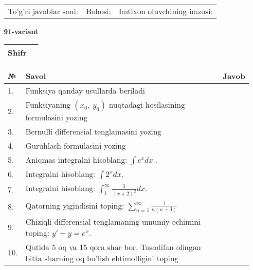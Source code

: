 \documentclass{article}
\begin{document}
  \vspace{1cm}
  
  \begin{tabular}{lll}
  To'g'ri javoblar soni: \underline{\hspace{1.5cm}} & 
  Bahosi: \underline{\hspace{1.5cm}} & 
  Imtixon oluvchining imzosi: \underline{\hspace{2cm}} \\
  \end{tabular}
  
  \egroup
  
  \newpage
  
  
  \textbf{91-variant}\\
  
  \bgroup
  \def\arraystretch{1.6} %
  
  \begin{tabular}{|m{5.7cm}|m{9.5cm}|}
  \hline
  Shifr & \\
  \hline
  \end{tabular}
  
  \vspace{1cm}
  
  \begin{tabular}{|m{0.7cm}|m{10cm}|m{4cm}|}
  \hline
  № & Savol & Javob \\
  \hline
  1. & Funksiya qanday usullarda beriladi &  \\
  \hline
  2. & Funksiyaning \((x_{0},\ y_{0})\) nuqtadagi hosilasining formulasini yozing &  \\
  \hline
  3. & Bernulli differensial tenglamasini yozing &  \\
  \hline
  4. & Guruhlash formulasini yozing &  \\
  \hline
  5. & Aniqmas integralni hisoblang: \(\int {e^{x}dx}\) . &  \\
  \hline
  6. & Integralni hisoblang: \(\int {2^{x}dx}\). &  \\
  \hline
  7. & Integralni hisoblang: \(\int_{1}^{\infty}{\frac{1}{(x + 2)^{2}}dx}\). &  \\
  \hline
  8. & Qatorning yigindisini toping: \(\sum_{n = 1}^{\infty}\frac{1}{n(n + 3)}\) &  \\
  \hline
  9. & Chiziqli differensial tenglamaning umumiy echimini toping: \(y' + y = e^{x}\). &  \\
  \hline
  10. & Qutida 5 oq va 15 qora shar bor. Tasodifan olingan bitta sharning oq bo'lish ehtimolligini toping &  \\
  \hline
  \end{tabular}
  
\end{document}
